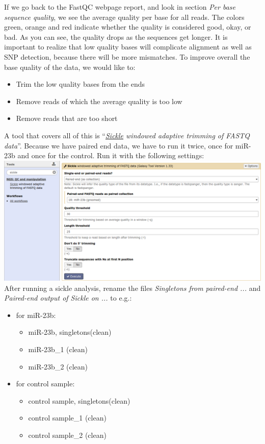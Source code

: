 If we go back to the FastQC webpage report, and look in section \textit{Per base sequence quality}, we see the average quality per base for all reads. The colors green, orange and red indicate whether the quality is considered good, okay, or bad. As you can see, the quality drops as the sequences get longer. It is important to realize that low quality bases will complicate alignment as well as SNP detection, because there will be more mismatches. To improve overall the base quality of the data, we would like to:
\begin{itemize}
	\item Trim the low quality bases from the ends
	\item Remove reads of which the average quality is too low
	\item Remove reads that are too short
\end{itemize}
A tool that covers all of this is ``\textit{\underline{Sickle} windowed adaptive trimming of FASTQ data}''. Because we have paired end data, we have to run it twice, once for miR-23b and once for the control. Run it with the following settings:\\
\includegraphics[width=\textwidth]{figures/qc_06.png}\\
After running a sickle analysis, rename the files 
\textit{Singletons from paired-end ...} and \textit{Paired-end output of Sickle on ...} to e.g.:
\begin{itemize}
	\item[] for miR-23b:
	\begin{itemize}
		\item miR-23b, singletons(clean)
		\item miR-23b_1 (clean)
		\item miR-23b_2 (clean)
	\end{itemize}
	\item[] for control sample:
	\begin{itemize}
		\item control sample, singletons(clean)
		\item control sample_1 (clean)
		\item control sample_2 (clean)
	\end{itemize}
\end{itemize}

